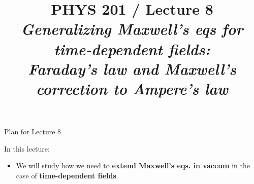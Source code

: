 \renewcommand{\prevlecture}{7 }
\renewcommand{\thislecture}{8 }
\renewcommand{\nextlecture}{9 }

%
%

\title[PHYS 201 / Lecture \thislecture]
{
  PHYS 201 / Lecture \thislecture\\
  {\it
       Generalizing Maxwell's eqs for time-dependent fields: \\
      Faraday's law and Maxwell's correction to Ampere's law
  }\\
}



\begin{frame}[plain]
  \titlepage
\end{frame}


%
%

\renewcommand{\lecturesummarytitle}{Revision }


%
%

\begin{frame}{Plan for Lecture \thislecture}

In this lecture:
\begin{itemize}
   \item We will study how we need to {\bf extend Maxwell's eqs. in vaccum}
         in the case of {\bf time-dependent fields}.
\end{itemize}

\end{frame}


%
%
%

